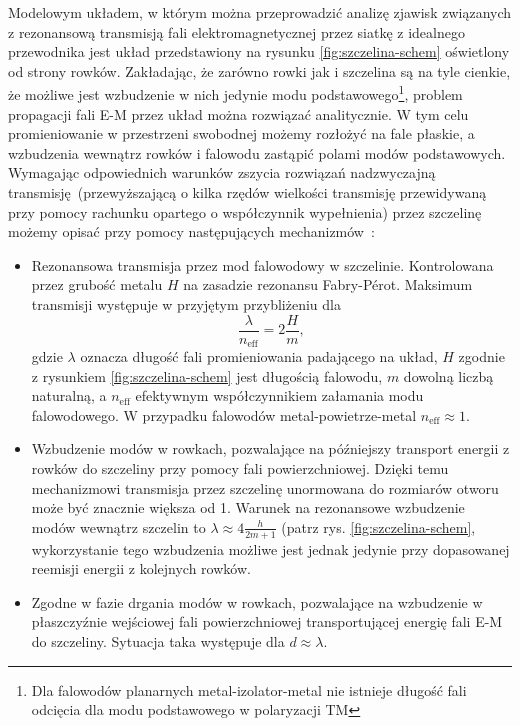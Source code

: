 Modelowym układem, w którym można przeprowadzić analizę zjawisk związanych z rezonansową transmisją fali elektromagnetycznej przez siatkę z idealnego przewodnika jest układ przedstawiony na rysunku \ref{fig:szczelina-schem} oświetlony od strony rowków. Zakładając, że zarówno rowki jak i szczelina są na tyle cienkie, że możliwe jest wzbudzenie w nich jedynie modu podstawowego\footnote{Dla falowodów planarnych metal-izolator-metal nie istnieje długość fali odcięcia dla modu podstawowego w polaryzacji TM}, problem propagacji fali E-M przez układ można rozwiązać analitycznie. W tym celu promieniowanie w przestrzeni swobodnej możemy rozłożyć na fale płaskie, a wzbudzenia wewnątrz rowków i falowodu zastąpić polami modów podstawowych. Wymagając odpowiednich warunków zszycia rozwiązań nadzwyczajną transmisję~(przewyższającą o kilka rzędów wielkości transmisję przewidywaną przy pomocy rachunku opartego o współczynnik wypełnienia) przez szczelinę możemy opisać przy pomocy następujących mechanizmów~\cite{martin2001theory}:
\begin{itemize}
	\item Rezonansowa transmisja przez mod falowodowy w szczelinie. Kontrolowana przez grubość metalu $H$ na zasadzie rezonansu Fabry-P\'{e}rot. Maksimum transmisji występuje w przyjętym przybliżeniu dla
\begin{equation}
\frac{\lambda}{n_{\textrm{eff}}} = 2 \frac {H}{m},
\label{eq:fp-szczelina}
\end{equation}
gdzie $\lambda$ oznacza długość fali promieniowania padającego na układ, $H$ zgodnie z rysunkiem \ref{fig:szczelina-schem} jest długością falowodu, $m$ dowolną liczbą naturalną, a $n_{\textrm{eff}}$ efektywnym współczynnikiem załamania modu falowodowego. W przypadku falowodów metal-powietrze-metal $n_{\textrm{eff}} \approx 1$.
	\item Wzbudzenie modów w rowkach, pozwalające na późniejszy transport energii z rowków do szczeliny przy pomocy fali powierzchniowej. Dzięki temu mechanizmowi transmisja przez szczelinę unormowana do rozmiarów otworu może być znacznie większa od 1. Warunek na rezonansowe wzbudzenie modów wewnątrz szczelin to $\lambda \approx 4 \frac {h}{2m+1}$ (patrz rys. \ref{fig:szczelina-schem}, wykorzystanie tego wzbudzenia możliwe jest jednak jedynie przy dopasowanej reemisji energii z kolejnych rowków.
	\item Zgodne w fazie drgania modów w rowkach, pozwalające na wzbudzenie w płaszczyźnie wejściowej fali powierzchniowej transportującej energię fali E-M do szczeliny. Sytuacja taka występuje dla $d \approx \lambda$.
\end{itemize}


